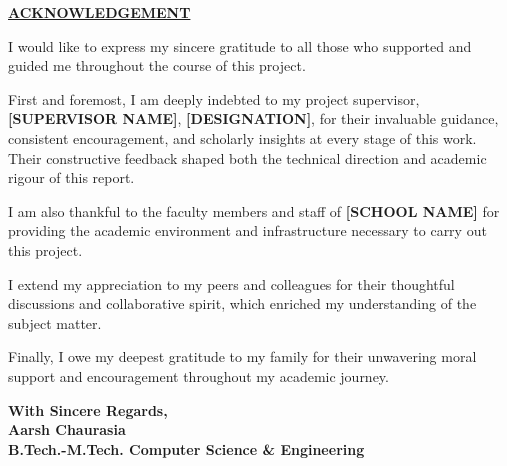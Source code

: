 {\centering
    \par
    \large \textbf{\underline{ACKNOWLEDGEMENT}} \par
}\vspace{0.7cm}

\noindent I would like to express my sincere gratitude to all those who supported and guided me throughout the course of this project.

\noindent First and foremost, I am deeply indebted to my project supervisor, \textbf{[SUPERVISOR NAME]}, \textbf{[DESIGNATION]}, for their invaluable guidance, consistent encouragement, and scholarly insights at every stage of this work. Their constructive feedback shaped both the technical direction and academic rigour of this report.

\noindent I am also thankful to the faculty members and staff of \textbf{[SCHOOL NAME]} for providing the academic environment and infrastructure necessary to carry out this project.

\noindent I extend my appreciation to my peers and colleagues for their thoughtful discussions and collaborative spirit, which enriched my understanding of the subject matter.

\noindent Finally, I owe my deepest gratitude to my family for their unwavering moral support and encouragement throughout my academic journey.

\vspace{1cm}
\begin{flushright}
    \textbf{With Sincere Regards,}\\
    \textbf{Aarsh Chaurasia}\\
    \textbf{B.Tech.-M.Tech. Computer Science \& Engineering}
\end{flushright}
